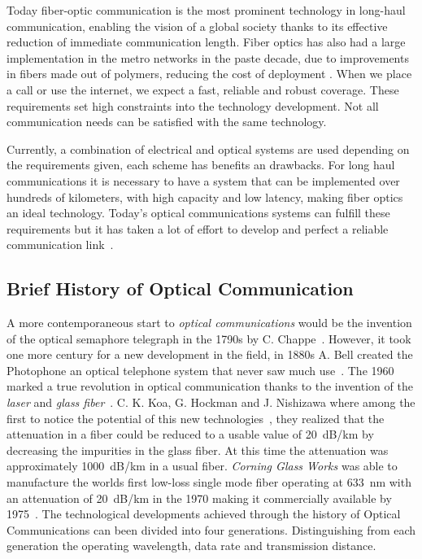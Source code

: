 Today fiber-optic communication is the most prominent technology in long-haul communication, enabling the vision of a global society thanks to its effective reduction of immediate communication length. Fiber optics has also had a large implementation in the metro networks in the paste decade, due to improvements in fibers made out of polymers, reducing the cost of deployment \cite{AccesFiber}. When we place a call or use the internet, we expect a fast, reliable and robust coverage. These requirements set high constraints into the technology  development. Not all communication needs can be satisfied with the same technology.

 Currently, a combination of electrical and optical systems are used depending on the requirements given, each scheme has benefits an drawbacks. For long haul communications it is necessary to have a system that can be implemented over hundreds of kilometers, with high capacity and low latency, making fiber optics an ideal technology. Today's optical communications systems can fulfill these requirements but it has taken a lot of effort to develop and perfect a reliable communication link~\cite{COChistory}.   

\subsection{Brief History of Optical Communication}

A more contemporaneous start to \textit{optical communications} would be the invention of the optical semaphore telegraph in the 1790s by C. Chappe~\cite{opticalsemaphore}. However, it took one more century for a new development in the field, in 1880s A. Bell created the Photophone an optical telephone system that never saw much use~\cite{opticalsemaphore,HistoryCommunication}. The 1960 marked a true revolution in optical communication thanks to the invention of the \textit{laser} and \textit{glass fiber}~\cite{ramaswami2009optical}. C. K. Koa, G. Hockman and J. Nishizawa  where among the first to notice the potential of this new technologies~\cite{kao1966dielectric,ProposeFiberCom}, they realized that the attenuation in a fiber could be reduced to a usable value of 20~dB/km by decreasing the impurities in the glass fiber. At this time the attenuation was approximately 1000~dB/km in a usual fiber.\textit{ Corning Glass Works} was able to manufacture the worlds first low-loss single mode fiber operating at 633~nm with an attenuation of 20~dB/km in the 1970 making it commercially available by 1975~\cite{opticalsemaphore,HistoryCommunication}. The technological developments  achieved through the history of Optical Communications  can been divided into four generations. Distinguishing from each generation the operating wavelength, data rate and transmission distance.

